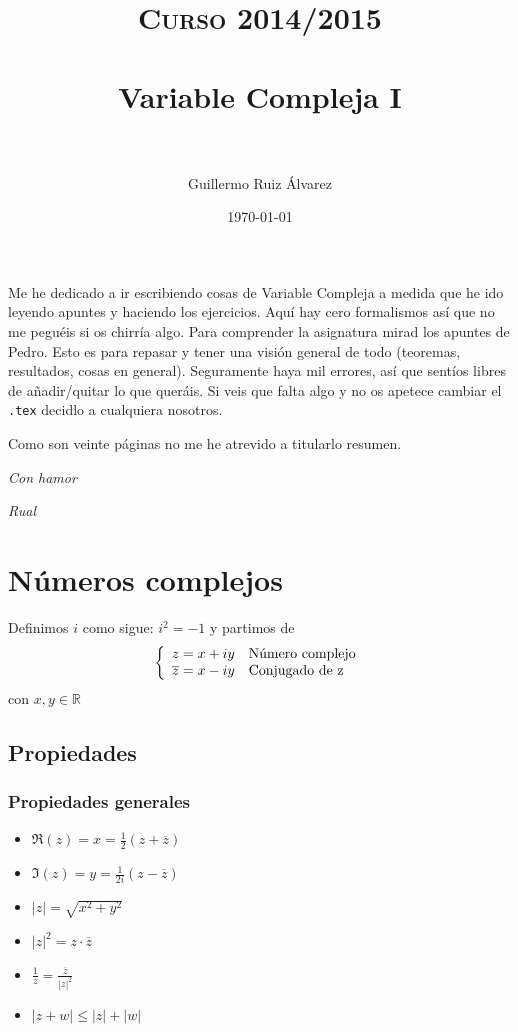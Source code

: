 \documentclass[paper=a4, fontsize=11pt]{scrartcl}
\title{
\normalfont \normalsize
\textsc{Curso 2014/2015} \\ [25pt]
\horrule{2pt} \\[0.5cm]
\huge Variable Compleja I\\
\horrule{2pt} \\[0.5cm]
}
\author{Guillermo Ruiz Álvarez}
\date{\normalsize\today}
\numberwithin{equation}{section}
\numberwithin{figure}{section}
\numberwithin{table}{section}
\begin{document}
\maketitle

Me he dedicado a ir escribiendo cosas de Variable Compleja a medida que he ido leyendo apuntes y haciendo los ejercicios. Aquí hay cero formalismos así que no me peguéis si os chirría algo. Para comprender la asignatura mirad los apuntes de Pedro. Esto es para repasar y tener una visión general de todo (teoremas, resultados, cosas en general). Seguramente haya mil errores, así que sentíos libres de añadir/quitar lo que queráis. Si veis que falta algo y no os apetece cambiar el \texttt{.tex} decidlo a cualquiera nosotros.

Como son veinte páginas no me he atrevido a titularlo resumen.
\begin{flushright}
\textit{Con hamor}

\textit{Rual}
\end{flushright}

\tableofcontents

\newpage
{}
\section{Números complejos}
Definimos $i$ como sigue: $\boxed{i^2=-1}$ y partimos de
\begin{equation*}
\left\{
\begin{array}{l l}
z=x+iy & \text{Número complejo}\\
\overline{z}=x-iy & \text{Conjugado de } $z$
\end{array}
\right.
\end{equation*}
con $x,y \in \mathbb{R}$

\subsection{Propiedades}

\subsubsection{Propiedades generales}\mbox{}

\begin{itemize}
\item $\Re(z)=x=\frac{1}{2}(z+\overline{z})$
\item $\Im(z)=y=\frac{1}{2i}(z-\overline{z})$
\item $|z|=\sqrt{x^2+y^2}$
\item $|z|^2=z\cdot\overline{z}$
\item $\frac{1}{z}=\frac{\overline{z}}{|z|^2}$
\item $|z+w|\le|z|+|w|$
\end{itemize}
\end{document}
